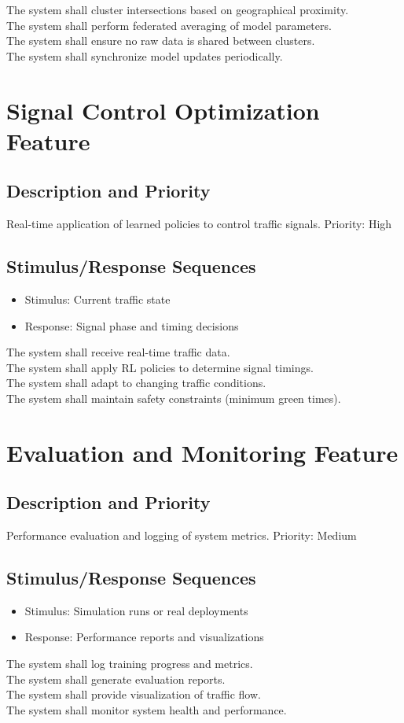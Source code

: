 \req The system shall cluster intersections based on geographical proximity. \\
\req The system shall perform federated averaging of model parameters. \\
\req The system shall ensure no raw data is shared between clusters. \\
\req The system shall synchronize model updates periodically.

\section{Signal Control Optimization Feature}

\subsection{Description and Priority}
Real-time application of learned policies to control traffic signals. Priority: High

\subsection{Stimulus/Response Sequences}
\begin{itemize}
\item Stimulus: Current traffic state
\item Response: Signal phase and timing decisions
\end{itemize}

\req The system shall receive real-time traffic data. \\
\req The system shall apply RL policies to determine signal timings. \\
\req The system shall adapt to changing traffic conditions. \\
\req The system shall maintain safety constraints (minimum green times).

\section{Evaluation and Monitoring Feature}

\subsection{Description and Priority}
Performance evaluation and logging of system metrics. Priority: Medium

\subsection{Stimulus/Response Sequences}
\begin{itemize}
\item Stimulus: Simulation runs or real deployments
\item Response: Performance reports and visualizations
\end{itemize}

\req The system shall log training progress and metrics. \\
\req The system shall generate evaluation reports. \\
\req The system shall provide visualization of traffic flow. \\
\req The system shall monitor system health and performance.